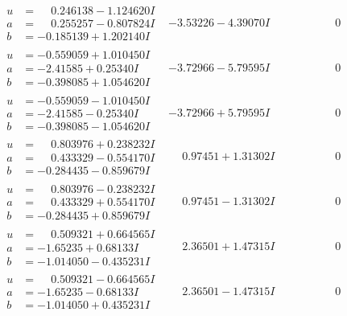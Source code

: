 \documentclass[1p]{elsarticle_modified}
\theoremstyle{definition}
\begin{document}
$$\begin{array}{c|c|c}
\begin{aligned}
u &= \phantom{-}0.246138 - 1.124620 I \\
a &= \phantom{-}0.255257 - 0.807824 I \\
b &= -0.185139 + 1.202140 I\end{aligned}
 & -3.53226 - 4.39070 I & \phantom{-0.000000 } 0 \\ \hline\begin{aligned}
u &= -0.559059 + 1.010450 I \\
a &= -2.41585 + 0.25340 I \\
b &= -0.398085 + 1.054620 I\end{aligned}
 & -3.72966 - 5.79595 I & \phantom{-0.000000 } 0 \\ \hline\begin{aligned}
u &= -0.559059 - 1.010450 I \\
a &= -2.41585 - 0.25340 I \\
b &= -0.398085 - 1.054620 I\end{aligned}
 & -3.72966 + 5.79595 I & \phantom{-0.000000 } 0 \\ \hline\begin{aligned}
u &= \phantom{-}0.803976 + 0.238232 I \\
a &= \phantom{-}0.433329 - 0.554170 I \\
b &= -0.284435 - 0.859679 I\end{aligned}
 & \phantom{-}0.97451 + 1.31302 I & \phantom{-0.000000 } 0 \\ \hline\begin{aligned}
u &= \phantom{-}0.803976 - 0.238232 I \\
a &= \phantom{-}0.433329 + 0.554170 I \\
b &= -0.284435 + 0.859679 I\end{aligned}
 & \phantom{-}0.97451 - 1.31302 I & \phantom{-0.000000 } 0 \\ \hline\begin{aligned}
u &= \phantom{-}0.509321 + 0.664565 I \\
a &= -1.65235 + 0.68133 I \\
b &= -1.014050 - 0.435231 I\end{aligned}
 & \phantom{-}2.36501 + 1.47315 I & \phantom{-0.000000 } 0 \\ \hline\begin{aligned}
u &= \phantom{-}0.509321 - 0.664565 I \\
a &= -1.65235 - 0.68133 I \\
b &= -1.014050 + 0.435231 I\end{aligned}
 & \phantom{-}2.36501 - 1.47315 I & \phantom{-0.000000 } 0 \\ \hline\begin{aligned}

\end{aligned}
\end{array}$$
\end{document}
